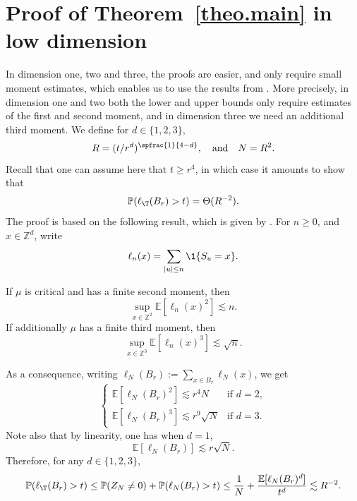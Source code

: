 \section{Proof of Theorem~\ref{theo.main} in low dimension}\label{sec-LD}
In dimension one, two and three, the proofs are easier, and only
require small moment estimates,
which enables us to use the results from \cite{AHJ}.
More precisely, in dimension one and two both the lower and upper bounds only require estimates of the
first and second moment,
and in dimension three we need an additional third moment. We define for $d\in \{1,2,3\}$,
\begin{equation*}
R = (t/r^d)^{\spfrac{1}{4-d}}, \quad \text{and}\quad N= R^2.
\end{equation*}
Recall that one can assume here that $t\ge r^4$, in which case it amounts to show that
\[
\mathbb P(\ell_\T(B_r) > t) = \Theta (R^{-2}).
\]
The proof is based on the following result, which is given by \cite[Lem.\,4.3]{AHJ}. For $n\ge 0$, and $x\in \mathbb Z^d$, write
\[
\ell_n(x) = \sum_{|u|\le n} \1\{S_u= x\}.
\]
\begin{lemma} \label{lem.AHJ}
If $\mu$ is critical and has a finite second moment, then
\begin{equation*}
\sup_{x\in \mathbb Z^2} \mathbb E[\ell_n(x)^2] \lesssim n.
\end{equation*}
If additionally $\mu$ has a finite third moment, then
\[
\sup_{x\in \mathbb Z^3} \mathbb E[\ell_n(x)^3]\lesssim \sqrt n.
\]
\end{lemma}
As a consequence, writing $\ell_N(B_r):= \sum_{x\in B_r} \ell_N(x)$, we get
\[
\begin{cases}
\mathbb E[\ell_N(B_r)^2] \lesssim
r^4 N & \text{if }d=2, \\[5pt]
\mathbb E[\ell_N(B_r)^3]\lesssim r^9 \sqrt{N} & \text{if }d=3.
\end{cases}
\]
Note also that by linearity, one has when $d=1$,
\[
\mathbb E[\ell_N(B_r)] \lesssim r \sqrt N.
\]
Therefore, for any $d\in \{1,2,3\}$,
\[
\mathbb P(\ell_\T(B_r) >t ) \le \mathbb P(Z_N \neq 0) + \mathbb P(\ell_N(B_r) >t )\le \frac 1N + \frac { \mathbb E[\ell_N(B_r)^d]}{t^d}\lesssim R^{-2}.
\]

